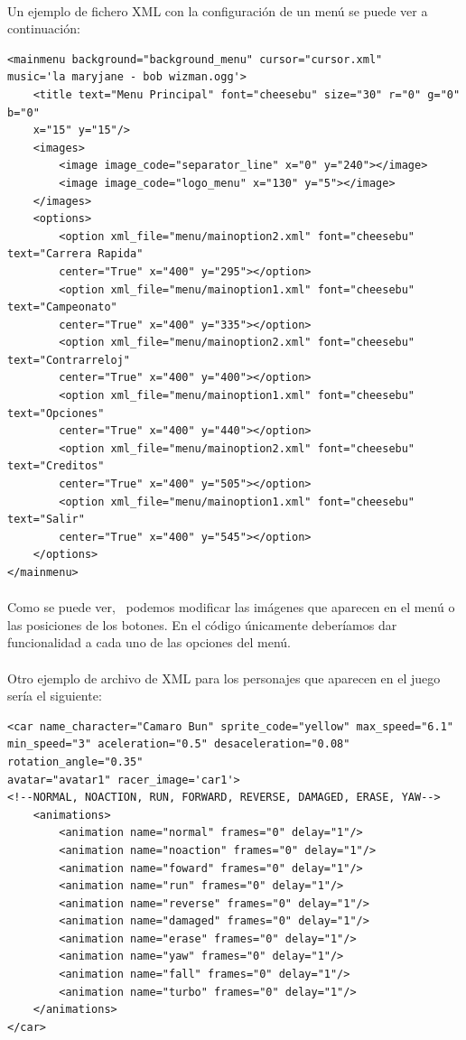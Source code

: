 \paragraph{}
Un ejemplo de fichero XML con la configuración de un menú se puede ver a continuación:

\begin{lstlisting}[style=XML]
<mainmenu background="background_menu" cursor="cursor.xml" 
music='la maryjane - bob wizman.ogg'>
    <title text="Menu Principal" font="cheesebu" size="30" r="0" g="0" b="0" 
    x="15" y="15"/>
    <images>
        <image image_code="separator_line" x="0" y="240"></image>
        <image image_code="logo_menu" x="130" y="5"></image>
    </images>
    <options>
        <option xml_file="menu/mainoption2.xml" font="cheesebu" text="Carrera Rapida" 
        center="True" x="400" y="295"></option>
        <option xml_file="menu/mainoption1.xml" font="cheesebu" text="Campeonato" 
        center="True" x="400" y="335"></option>
        <option xml_file="menu/mainoption2.xml" font="cheesebu" text="Contrarreloj" 
        center="True" x="400" y="400"></option>
        <option xml_file="menu/mainoption1.xml" font="cheesebu" text="Opciones" 
        center="True" x="400" y="440"></option>
        <option xml_file="menu/mainoption2.xml" font="cheesebu" text="Creditos" 
        center="True" x="400" y="505"></option>
        <option xml_file="menu/mainoption1.xml" font="cheesebu" text="Salir" 
        center="True" x="400" y="545"></option>
    </options>
</mainmenu>
\end{lstlisting}

\paragraph{}
Como se puede ver, ~podemos modificar las imágenes que aparecen en el menú o las posiciones de los botones.
En el código únicamente deberíamos dar funcionalidad a cada uno de las opciones del menú.

\paragraph{}
Otro ejemplo de archivo de XML para los personajes que aparecen en el juego sería el siguiente:

\begin{lstlisting}[style=XML]
<car name_character="Camaro Bun" sprite_code="yellow" max_speed="6.1" 
min_speed="3" aceleration="0.5" desaceleration="0.08" rotation_angle="0.35" 
avatar="avatar1" racer_image='car1'>
<!--NORMAL, NOACTION, RUN, FORWARD, REVERSE, DAMAGED, ERASE, YAW-->
    <animations>
        <animation name="normal" frames="0" delay="1"/>
        <animation name="noaction" frames="0" delay="1"/>
        <animation name="foward" frames="0" delay="1"/>
        <animation name="run" frames="0" delay="1"/>
        <animation name="reverse" frames="0" delay="1"/>
        <animation name="damaged" frames="0" delay="1"/>
        <animation name="erase" frames="0" delay="1"/>
        <animation name="yaw" frames="0" delay="1"/>
        <animation name="fall" frames="0" delay="1"/>
        <animation name="turbo" frames="0" delay="1"/>
    </animations>
</car>
\end{lstlisting}

